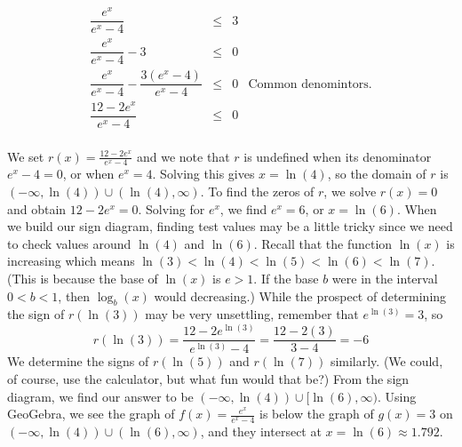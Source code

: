 {\begin{enumerate}
\[\begin{array}{rclr}
\dfrac{e^{x}}{e^{x}-4} & \leq & 3 & \\

\dfrac{e^{x}}{e^{x}-4} - 3 & \leq & 0 & \\

\dfrac{e^{x}}{e^{x}-4} - \dfrac{3 \left(e^{x}-4\right)}{e^{x}-4} & \leq & 0 & \mbox{Common denomintors.} \\

\dfrac{12 - 2e^{x}}{e^{x}-4} & \leq & 0 & \\

\end{array}\]
\setlength{\extrarowheight}{2pt}

We set $r(x) = \frac{12 - 2e^{x}}{e^{x}-4}$ and we note that $r$ is undefined when its denominator $e^{x}-4=0$, or when $e^{x} = 4$.  Solving this gives $x = \ln(4)$, so the domain of $r$ is $(-\infty, \ln(4)) \cup (\ln(4), \infty)$. To find the zeros of $r$, we solve $r(x) = 0$ and obtain $12 - 2e^{x} = 0$.  Solving for $e^{x}$, we find $e^{x} = 6$, or $x = \ln(6)$.  When we build our sign diagram, finding test values may be a little tricky since we need to check values around $\ln(4)$ and $\ln(6)$.  Recall that the function $\ln(x)$ is increasing  which means $\ln(3) < \ln(4) < \ln(5) < \ln(6) < \ln(7)$. (This is because the base of $\ln(x)$ is $e > 1$.  If the base $b$ were in the interval $0 < b < 1$, then $\log_{b}(x)$ would decreasing.) While the prospect of determining the sign of $r\left(\ln(3)\right)$ may be very unsettling, remember that $e^{\ln(3)} = 3$, so \[r\left(\ln(3)\right) = \frac{12 - 2e^{\ln(3)}}{e^{\ln(3)}-4} = \frac{12-2(3)}{3-4} = -6\]  We determine the signs of $r\left(\ln(5)\right)$ and $r\left(\ln(7)\right)$ similarly. (We could, of course, use the calculator, but what fun would that be?) From the sign diagram, we find our answer to be $(-\infty,\ln(4)) \cup [\ln(6), \infty)$.  Using GeoGebra, we see the graph of $f(x) = \frac{e^{x}}{e^{x}-4}$ is below the graph of $g(x) = 3$ on $(-\infty,\ln(4)) \cup (\ln(6), \infty)$, and they intersect at $x = \ln(6) \approx 1.792$.


\end{enumerate}}
